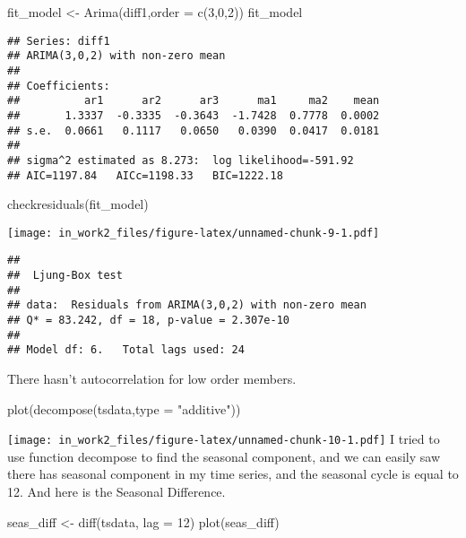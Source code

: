 \documentclass[
]{article}
\newenvironment{Shaded}{\begin{snugshade}}{\end{snugshade}}
\newcommand{\AttributeTok}[1]{\textcolor[rgb]{0.77,0.63,0.00}{#1}}
\newcommand{\DecValTok}[1]{\textcolor[rgb]{0.00,0.00,0.81}{#1}}
\newcommand{\FunctionTok}[1]{\textcolor[rgb]{0.00,0.00,0.00}{#1}}
\newcommand{\NormalTok}[1]{#1}
\newcommand{\OtherTok}[1]{\textcolor[rgb]{0.56,0.35,0.01}{#1}}
\newcommand{\StringTok}[1]{\textcolor[rgb]{0.31,0.60,0.02}{#1}}
\begin{document}
\begin{Shaded}
\begin{Highlighting}[]
\NormalTok{fit\_model }\OtherTok{\textless{}{-}} \FunctionTok{Arima}\NormalTok{(diff1,}\AttributeTok{order =} \FunctionTok{c}\NormalTok{(}\DecValTok{3}\NormalTok{,}\DecValTok{0}\NormalTok{,}\DecValTok{2}\NormalTok{))}
\NormalTok{fit\_model}
\end{Highlighting}
\end{Shaded}

\begin{verbatim}
## Series: diff1 
## ARIMA(3,0,2) with non-zero mean 
## 
## Coefficients:
##          ar1      ar2      ar3      ma1     ma2    mean
##       1.3337  -0.3335  -0.3643  -1.7428  0.7778  0.0002
## s.e.  0.0661   0.1117   0.0650   0.0390  0.0417  0.0181
## 
## sigma^2 estimated as 8.273:  log likelihood=-591.92
## AIC=1197.84   AICc=1198.33   BIC=1222.18
\end{verbatim}

\begin{Shaded}
\begin{Highlighting}[]
\FunctionTok{checkresiduals}\NormalTok{(fit\_model)}
\end{Highlighting}
\end{Shaded}

\texttt{[image: in\_work2\_files/figure-latex/unnamed-chunk-9-1.pdf]}

\begin{verbatim}
## 
##  Ljung-Box test
## 
## data:  Residuals from ARIMA(3,0,2) with non-zero mean
## Q* = 83.242, df = 18, p-value = 2.307e-10
## 
## Model df: 6.   Total lags used: 24
\end{verbatim}

There hasn't autocorrelation for low order members.

\begin{Shaded}
\begin{Highlighting}[]
\FunctionTok{plot}\NormalTok{(}\FunctionTok{decompose}\NormalTok{(tsdata,}\AttributeTok{type =} \StringTok{"additive"}\NormalTok{))}
\end{Highlighting}
\end{Shaded}

\texttt{[image: in\_work2\_files/figure-latex/unnamed-chunk-10-1.pdf]} I
tried to use function decompose to find the seasonal component, and we
can easily saw there has seasonal component in my time series, and the
seasonal cycle is equal to 12. And here is the Seasonal Difference.

\begin{Shaded}
\begin{Highlighting}[]
\NormalTok{seas\_diff }\OtherTok{\textless{}{-}} \FunctionTok{diff}\NormalTok{(tsdata, }\AttributeTok{lag =} \DecValTok{12}\NormalTok{)}
\FunctionTok{plot}\NormalTok{(seas\_diff)}
\end{Highlighting}
\end{Shaded}
\end{document}
